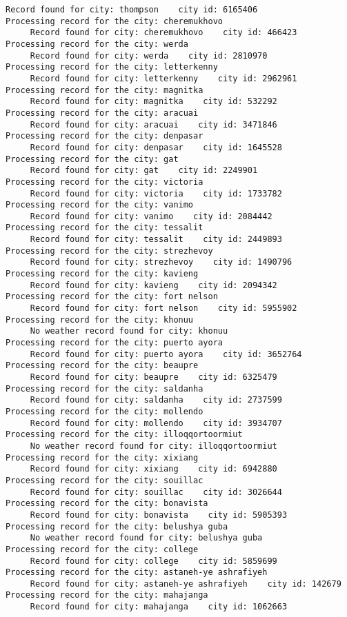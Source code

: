 \documentclass[11pt]{article}
\begin{document}
\begin{Verbatim}[commandchars=\\\{\}]
     Record found for city: thompson    city id: 6165406
Processing record for the city: cheremukhovo
     Record found for city: cheremukhovo    city id: 466423
Processing record for the city: werda
     Record found for city: werda    city id: 2810970
Processing record for the city: letterkenny
     Record found for city: letterkenny    city id: 2962961
Processing record for the city: magnitka
     Record found for city: magnitka    city id: 532292
Processing record for the city: aracuai
     Record found for city: aracuai    city id: 3471846
Processing record for the city: denpasar
     Record found for city: denpasar    city id: 1645528
Processing record for the city: gat
     Record found for city: gat    city id: 2249901
Processing record for the city: victoria
     Record found for city: victoria    city id: 1733782
Processing record for the city: vanimo
     Record found for city: vanimo    city id: 2084442
Processing record for the city: tessalit
     Record found for city: tessalit    city id: 2449893
Processing record for the city: strezhevoy
     Record found for city: strezhevoy    city id: 1490796
Processing record for the city: kavieng
     Record found for city: kavieng    city id: 2094342
Processing record for the city: fort nelson
     Record found for city: fort nelson    city id: 5955902
Processing record for the city: khonuu
     No weather record found for city: khonuu
Processing record for the city: puerto ayora
     Record found for city: puerto ayora    city id: 3652764
Processing record for the city: beaupre
     Record found for city: beaupre    city id: 6325479
Processing record for the city: saldanha
     Record found for city: saldanha    city id: 2737599
Processing record for the city: mollendo
     Record found for city: mollendo    city id: 3934707
Processing record for the city: illoqqortoormiut
     No weather record found for city: illoqqortoormiut
Processing record for the city: xixiang
     Record found for city: xixiang    city id: 6942880
Processing record for the city: souillac
     Record found for city: souillac    city id: 3026644
Processing record for the city: bonavista
     Record found for city: bonavista    city id: 5905393
Processing record for the city: belushya guba
     No weather record found for city: belushya guba
Processing record for the city: college
     Record found for city: college    city id: 5859699
Processing record for the city: astaneh-ye ashrafiyeh
     Record found for city: astaneh-ye ashrafiyeh    city id: 142679
Processing record for the city: mahajanga
     Record found for city: mahajanga    city id: 1062663

\end{Verbatim}
\end{document}
